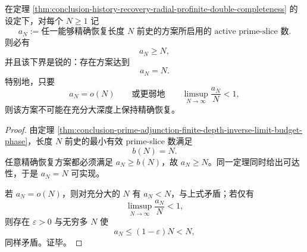 \begin{corollary}\label{cor:conclusion-history-recovery-active-prime-slice-linear-depth}
在定理 \ref{thm:conclusion-history-recovery-radial-profinite-double-completeness} 的设定下，对每个 \(N\ge 1\) 记
\[
a_N:=\text{任一能够精确恢复长度 }N\text{ 前史的方案所启用的 active prime-slice 数}.
\]
则必有
\[
a_N\ge N,
\]
并且该下界是锐的：存在方案达到
\[
a_N=N.
\]
特别地，只要
\[
a_N=o(N)
\qquad\text{或更弱地}\qquad
\limsup_{N\to\infty}\frac{a_N}{N}<1,
\]
则该方案不可能在充分大深度上保持精确恢复。
\end{corollary}
\begin{proof}
由定理 \ref{thm:conclusion-prime-adjunction-finite-depth-inverse-limit-budget-phase}，长度 \(N\) 前史的最小有效 prime-slice 数满足
\[
b(N)=N.
\]
任意精确恢复方案都必须满足 \(a_N\ge b(N)\)，故 \(a_N\ge N\)。同一定理同时给出可达性，于是 \(a_N=N\) 可实现。

若 \(a_N=o(N)\)，则对充分大的 \(N\) 有 \(a_N<N\)，与上式矛盾；若仅有
\[
\limsup_{N\to\infty}\frac{a_N}{N}<1,
\]
则存在 \(\varepsilon>0\) 与无穷多 \(N\) 使
\[
a_N\le (1-\varepsilon)N<N,
\]
同样矛盾。证毕。
\end{proof}

